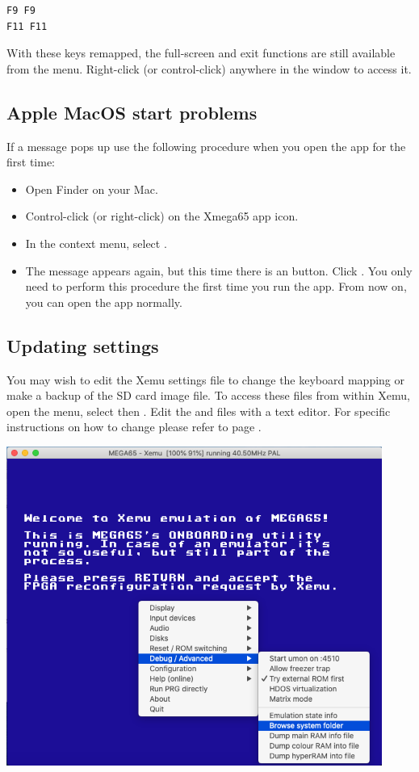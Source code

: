 \begin{tcolorbox}[colback=black,coltext=white]
\verbatimfont{\codefont}
\begin{verbatim}
F9 F9
F11 F11
\end{verbatim}
\end{tcolorbox}

With these keys remapped, the full-screen and exit functions are still available from
the menu. Right-click (or control-click) anywhere in the window to access it.

\subsection{Apple MacOS start problems}

If a message  pops up
use the following procedure when you open the app for the first time:

\begin{itemize}
  \item Open Finder on your Mac.
  \item Control-click (or right-click) on the Xmega65 app icon.
  \item In the context menu, select .
  \item The message appears again, but this time there is an  button.
        Click . You only need to perform this procedure the first time you
		run the app. From now on, you can open the app normally.
\end{itemize}

\subsection{Updating settings}
\label{sec:sdcard-settings-location}

You may wish to edit the Xemu settings file to change the keyboard mapping or make
a backup of the SD card image file. To access these files from within Xemu, open the
menu, select  then . Edit the
 and  files with a text editor.
For specific instructions on how to change  please refer to
page \pageref{sec:xemu-keyboard}.

\begin{center}
  \includegraphics[width=0.5\linewidth]{images/xemusettings.png}
\end{center}

